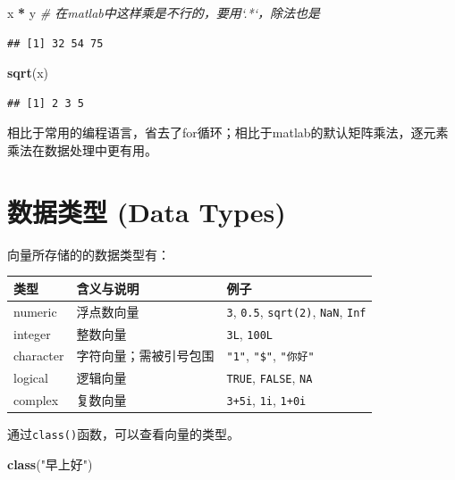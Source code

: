 \documentclass[]{book}
\newenvironment{Shaded}{\begin{snugshade}}{\end{snugshade}}
\newcommand{\CommentTok}[1]{\textcolor[rgb]{0.56,0.35,0.01}{\textit{#1}}}
\newcommand{\KeywordTok}[1]{\textcolor[rgb]{0.13,0.29,0.53}{\textbf{#1}}}
\newcommand{\NormalTok}[1]{#1}
\newcommand{\OperatorTok}[1]{\textcolor[rgb]{0.81,0.36,0.00}{\textbf{#1}}}
\newcommand{\StringTok}[1]{\textcolor[rgb]{0.31,0.60,0.02}{#1}}
\begin{document}
\begin{Shaded}
\begin{Highlighting}[]
\NormalTok{x }\OperatorTok{*}\StringTok{ }\NormalTok{y }\CommentTok{# 在matlab中这样乘是不行的，要用`.*`，除法也是}
\end{Highlighting}
\end{Shaded}

\begin{verbatim}
## [1] 32 54 75
\end{verbatim}

\begin{Shaded}
\begin{Highlighting}[]
\KeywordTok{sqrt}\NormalTok{(x)}
\end{Highlighting}
\end{Shaded}

\begin{verbatim}
## [1] 2 3 5
\end{verbatim}

相比于常用的编程语言，省去了for循环；相比于matlab的默认矩阵乘法，逐元素乘法在数据处理中更有用。

\hypertarget{-data-types}{%
\section{数据类型 (Data Types)}\label{-data-types}}

向量所存储的的数据类型有：

\begin{longtable}[]{@{}lll@{}}
\toprule
类型 & 含义与说明 & 例子\tabularnewline
\midrule
\endhead
numeric & 浮点数向量 & \texttt{3}, \texttt{0.5}, \texttt{sqrt(2)}, \texttt{NaN}, \texttt{Inf}\tabularnewline
integer & 整数向量 & \texttt{3L}, \texttt{100L}\tabularnewline
character & 字符向量；需被引号包围 & \texttt{"1"}, \texttt{"\$"}, \texttt{"你好"}\tabularnewline
logical & 逻辑向量 & \texttt{TRUE}, \texttt{FALSE}, \texttt{NA}\tabularnewline
complex & 复数向量 & \texttt{3+5i}, \texttt{1i}, \texttt{1+0i}\tabularnewline
\bottomrule
\end{longtable}

通过\texttt{class()}函数，可以查看向量的类型。

\begin{Shaded}
\begin{Highlighting}[]
\KeywordTok{class}\NormalTok{(}\StringTok{"早上好"}\NormalTok{)}
\end{Highlighting}
\end{Shaded}
\end{document}

